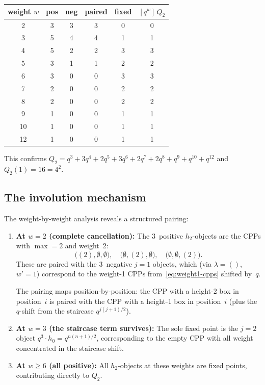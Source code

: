 \documentclass[11pt]{article}
\begin{document}
\begin{center}
\begin{tabular}{c|ccccc}
weight $w$ & pos & neg & paired & fixed & $[q^w]\,Q_2$ \\
\hline
2 & 3 & 3 & 3 & 0 & 0 \\
3 & 5 & 4 & 4 & 1 & 1 \\
4 & 5 & 2 & 2 & 3 & 3 \\
5 & 3 & 1 & 1 & 2 & 2 \\
6 & 3 & 0 & 0 & 3 & 3 \\
7 & 2 & 0 & 0 & 2 & 2 \\
8 & 2 & 0 & 0 & 2 & 2 \\
9 & 1 & 0 & 0 & 1 & 1 \\
10 & 1 & 0 & 0 & 1 & 1 \\
12 & 1 & 0 & 0 & 1 & 1
\end{tabular}
\end{center}

\noindent
This confirms $Q_2 = q^3 + 3q^4 + 2q^5 + 3q^6 + 2q^7 + 2q^8 + q^9 + q^{10} + q^{12}$
and $Q_2(1) = 16 = 4^2$.

\subsection{The involution mechanism}
\label{ssec:involution-mechanism}

The weight-by-weight analysis reveals a structured pairing:

\begin{enumerate}
  \item \textbf{At $w = 2$ (complete cancellation):}
    The 3~positive $h_2$-objects are the CPPs with $\max = 2$ and weight~2:
    \[
      \bigl((2), \emptyset, \emptyset\bigr), \quad
      \bigl(\emptyset, (2), \emptyset\bigr), \quad
      \bigl(\emptyset, \emptyset, (2)\bigr).
    \]
    These are paired with the 3~negative $j=1$ objects, which
    (via $\lambda = ()$, $w' = 1$) correspond to the weight-1 CPPs
    from~\eqref{eq:weight1-cpps} shifted by~$q$.

    The pairing maps position-by-position: the CPP with a height-2 box
    in position~$i$ is paired with the CPP with a height-1 box in position~$i$
    (plus the $q$-shift from the staircase $q^{j(j+1)/2}$).

  \item \textbf{At $w = 3$ (the staircase term survives):}
    The sole fixed point is the $j = 2$ object $q^3 \cdot h_0 = q^{n(n+1)/2}$,
    corresponding to the empty CPP with all weight concentrated in the
    staircase shift.

  \item \textbf{At $w \geq 6$ (all positive):}
    All $h_2$-objects at these weights are fixed points, contributing
    directly to $Q_2$.
\end{enumerate}
\end{document}
